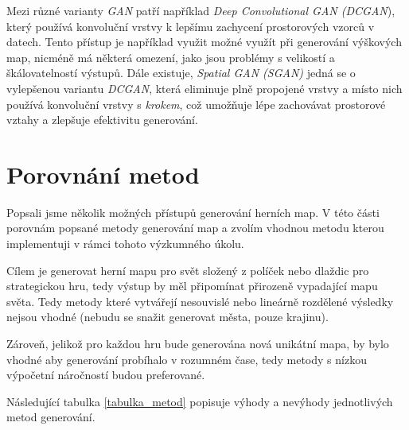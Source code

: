 Mezi různé varianty \textit{GAN} patří například \textit{Deep Convolutional GAN (DCGAN}), který používá konvoluční vrstvy k lepšímu zachycení prostorových vzorců v datech. Tento přístup je například využit možné využít při generování výškových map, nicméně má některá omezení, jako jsou problémy s velikostí a škálovatelností výstupů. Dále existuje, \textit{Spatial GAN (SGAN)} jedná se o vylepšenou variantu \textit{DCGAN}, která eliminuje plně propojené vrstvy a místo nich používá konvoluční vrstvy s \textit{krokem}, což umožňuje lépe zachovávat prostorové vztahy a zlepšuje efektivitu generování. \cite{GANclanek}



\section{Porovnání metod}

Popsali jsme několik možných přístupů generování herních map. V této části porovnám popsané metody generování map a zvolím vhodnou metodu kterou implementuji v rámci tohoto výzkumného úkolu. 

Cílem je generovat herní mapu pro svět složený z políček nebo dlaždic pro strategickou hru, tedy výstup by měl připomínat přirozeně vypadající mapu světa. Tedy metody které vytvářejí nesouvislé nebo lineárně rozdělené výsledky nejsou vhodné (nebudu se snažit generovat města, pouze krajinu). 

Zároveň, jelikož pro každou hru bude generována nová unikátní mapa, by bylo vhodné aby generování probíhalo v rozumném čase, tedy metody s nízkou výpočetní náročností budou preferované.

Následující tabulka \ref{tabulka_metod} popisuje výhody a nevýhody jednotlivých metod generování.



